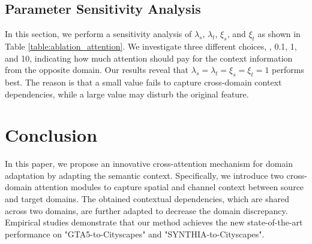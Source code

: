 \documentclass[10pt,twocolumn,letterpaper]{article}
\begin{document}
	\subsection{Parameter Sensitivity Analysis}

	In this section, we perform a sensitivity analysis of $ \lambda_{s} $, $ \lambda_{t} $, $ \xi_{s} $, and $ \xi_{t} $ as shown in Table \ref{table:ablation_attention}. We investigate three different choices, \ie, 0.1, 1, and 10, indicating how much attention should pay for the context information from the opposite domain. Our results reveal that $ \lambda_{s}=\lambda_{t}=\xi_{s}=\xi_{t}=1 $ performs best. The reason is that a small value fails to capture cross-domain context dependencies, while a large value may disturb the original feature.

	\iffalse
	\begin{figure}[t]
		\begin{center}
			\texttt{[image: attention-eps-converted-to.pdf]}
		\end{center}
		\caption{An example of channel attention map.}
		\label{fig:channel_attention_map}
		\vspace{-0.2in}
	\end{figure}
	\fi

	\section{Conclusion}

	In this paper, we propose an innovative cross-attention mechanism for domain adaptation
	by adapting the semantic context. Specifically, we introduce two cross-domain attention modules to capture spatial and channel context between source and target domains. The obtained contextual dependencies, which are shared across two domains, are further adapted to decrease the domain discrepancy. Empirical studies demonstrate that our method achieves the new state-of-the-art performance on "GTA5-to-Cityscapes" and "SYNTHIA-to-Cityscapes".

	{\small
		
		
	}
\end{document}
